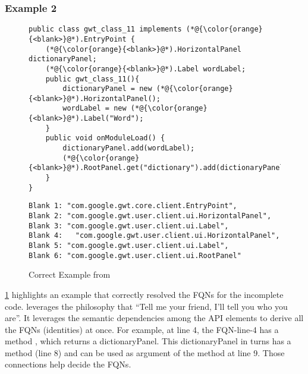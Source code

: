 \subsubsection{Example 2}

\begin{figure}[t]
	\centering
\begin{minipage}{.52\textwidth}
\begin{lstlisting}[label = left5, caption = Project: gwt class 11]
public class gwt_class_11 implements (*@{\color{orange}{<blank>}@*).EntryPoint {
    (*@{\color{orange}{<blank>}@*).HorizontalPanel dictionaryPanel;
    (*@{\color{orange}{<blank>}@*).Label wordLabel;
    public gwt_class_11(){
        dictionaryPanel = new (*@{\color{orange}{<blank>}@*).HorizontalPanel();
        wordLabel = new (*@{\color{orange}{<blank>}@*).Label("Word");
    }
    public void onModuleLoad() {
        dictionaryPanel.add(wordLabel);
        (*@{\color{orange}{<blank>}@*).RootPanel.get("dictionary").add(dictionaryPanel);
    }
}
\end{lstlisting}
\end{minipage}
\hspace{2pt}
\begin{minipage}{.46\textwidth}
\begin{lstlisting}[label = right5, caption = Ground Truth]
Blank 1: "com.google.gwt.core.client.EntryPoint",
Blank 2: "com.google.gwt.user.client.ui.HorizontalPanel", 
Blank 3: "com.google.gwt.user.client.ui.Label", 
Blank 4:   "com.google.gwt.user.client.ui.HorizontalPanel", 
Blank 5: "com.google.gwt.user.client.ui.Label", 
Blank 6: "com.google.gwt.user.client.ui.RootPanel"

\end{lstlisting}
\end{minipage}  
\vspace{-18pt}
\caption{Correct Example from {\tool}}
\label{eval:example6}
\end{figure}


{\ref{eval:example6}} highlights an example that {\tool} correctly
resolved the FQNs for the incomplete code. {\tool} leverages the
philosophy that ``Tell me your friend, I'll tell you who you are''.
It leverages the semantic dependencies among the API elements to derive
all the FQNs (identities) at once. For example, at line 4, the FQN-line-4
has a method , which returns a dictionaryPanel. This
dictionaryPanel in turns has a method  (line 8) and
can be used as argument of the method  at line 9. Those
connections help {\tool} decide the FQNs.

